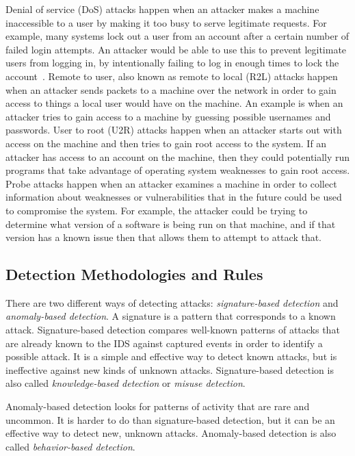 \documentclass{sig-alternate}
\begin{document}
Denial of service (DoS) attacks happen when an attacker makes a machine inaccessible to a user by making it too busy to serve legitimate requests. For example, many systems lock out a user from an account after a certain number of failed login attempts. An attacker would be able to use this to prevent legitimate users from logging in, by intentionally failing to log in enough times to lock the account~\cite{DoSAttacks}. Remote to user, also known as remote to local (R2L) attacks happen when an attacker sends packets to a machine over the network in order to gain access to things a local user would have on the machine. An example is when an attacker tries to gain access to a machine by guessing possible usernames and passwords. User to root (U2R) attacks happen when an attacker starts out with access on the machine and then tries to gain root access to the system. If an attacker has access to an account on the machine, then they could potentially run programs that take advantage of operating system weaknesses to gain root access. Probe attacks happen when an attacker examines a machine in order to collect information about weaknesses or vulnerabilities that in the future could be used to compromise the system. For example, the attacker could be trying to determine what version of a software is being run on that machine, and if that version has a known issue then that allows them to attempt to attack that.~\cite{DBLP:journals/corr/abs-1204-1336, typesOfAttacks}




\subsection{Detection Methodologies and Rules}
\label{sec:detectionMeth}
There are two different ways of detecting attacks: \emph{signature-based detection} and \emph{anomaly-based detection}. A signature is a pattern that corresponds to a known attack. Signature-based detection compares well-known patterns of attacks that are already known to the IDS against captured events in order to identify a possible attack. It is a simple and effective way to detect known attacks, but is ineffective against new kinds of unknown attacks. Signature-based detection is also called \emph{knowledge-based detection} or \emph{misuse detection}.~\cite{Liao201316}

Anomaly-based detection looks for patterns of activity that are rare and uncommon. It is harder to do than signature-based detection, but it can be an effective way to detect new, unknown attacks. Anomaly-based detection is also called \emph{behavior-based detection}.~\cite{DBLP:journals/corr/abs-1204-1336}
\end{document}

